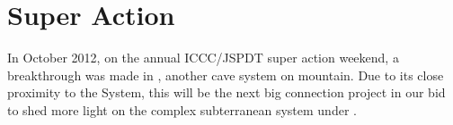 \section{Super Action}

In October 2012, on the annual ICCC/JSPDT super action weekend, a
breakthrough was made in , another cave system on
mountain. Due to its close proximity to the System, this will be the
next big connection project in our bid to shed more light on the complex
subterranean system under .